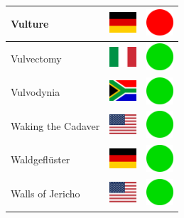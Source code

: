 \documentclass[12pt, a4paper, twoside]{report}
\begin{document}
\begin{center}
\begin{longtable}{|p{5cm}|p{2cm}|p{2cm}|}
 Vulture                                                    & \includegraphics[width=1cm]{../4x3/de} &   \includegraphics[width=1cm]{../likes/n} \\ \hline
 Vulvectomy                                                 & \includegraphics[width=1cm]{../4x3/it} &   \includegraphics[width=1cm]{../likes/y} \\ \hline
 Vulvodynia                                                 & \includegraphics[width=1cm]{../4x3/za} &   \includegraphics[width=1cm]{../likes/y} \\ \hline
 Waking the Cadaver                                         & \includegraphics[width=1cm]{../4x3/us} &   \includegraphics[width=1cm]{../likes/y} \\ \hline
 Waldgeflüster                                              & \includegraphics[width=1cm]{../4x3/de} &   \includegraphics[width=1cm]{../likes/y} \\ \hline
 Walls of Jericho                                           & \includegraphics[width=1cm]{../4x3/us} &   \includegraphics[width=1cm]{../likes/y} \\ \hline

\end{longtable}
\end{center}
\end{document}
